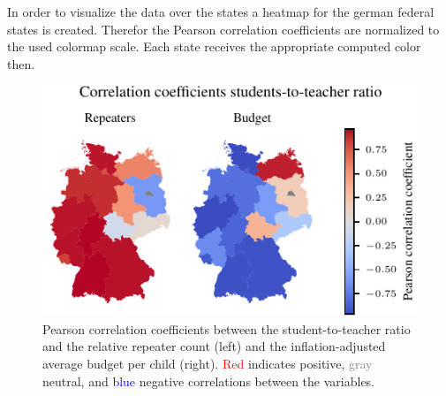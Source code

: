 In order to visualize the data over the states a heatmap for the german federal states is created. Therefor the Pearson correlation coefficients are normalized to the used colormap scale. Each state receives the appropriate computed color then.

\begin{figure}[h]
    \centering
    \includegraphics{fig/fig_heatmap_correlation_students_per_teacher_repeaters_budget.pdf}
    \caption{Pearson correlation coefficients between the student-to-teacher ratio and the relative repeater count (left) and the inflation-adjusted average budget per child (right). \textcolor{red}{Red} indicates positive, \textcolor{gray}{gray} neutral, and \textcolor{blue}{blue} negative correlations between the variables.}
    \label{fig:heatmap_correlation_students_per_teacher_repeaters_budget}
\end{figure}
